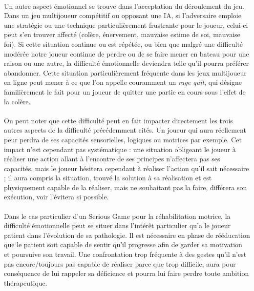 \paragraph{}
Un autre aspect émotionnel se trouve dans l’acceptation du déroulement du jeu. Dans un jeu multijoueur compétitif ou opposant une IA, si l’adversaire emploie une stratégie ou une technique particulièrement frustrante pour le joueur, celui-ci peut s’en trouver affecté (colère, énervement, mauvaise estime de soi, mauvaise foi). Si cette situation continue ou est répétée, ou bien que malgré une difficulté modérée notre joueur continue de perdre ou de se faire mener en bateau pour une raison ou une autre, la difficulté émotionnelle deviendra telle qu’il pourra préférer abandonner. Cette situation particulièrement fréquente dans les jeux multijoueur en ligne peut mener à ce que l’on appelle couramment un \emph{rage quit}, qui désigne familièrement le fait pour un joueur de quitter une partie en cours sous l'effet de la colère.

\paragraph{}On peut noter que cette difficulté peut en fait impacter directement les trois autres aspects de la difficulté précédemment cités. Un joueur qui aura réellement peur perdra de ses capacités sensorielles, logiques ou motrices par exemple. Cet impact n’est cependant pas systématique : une situation obligeant le joueur à réaliser une action allant à l’encontre de ses principes n’affectera pas ses capacités, mais le joueur hésitera cependant à réaliser l’action qu’il sait nécessaire ; il aura compris la situation, trouvé la solution à sa réalisation et est physiquement capable de la réaliser, mais ne souhaitant pas la faire, différera son exécution, voir l’évitera si possible.

\paragraph{}Dans le cas particulier d’un Serious Game pour la réhabilitation motrice, la difficulté émotionnelle peut se situer dans l’intérêt particulier qu’a le joueur patient dans l’évolution de sa pathologie. Il est nécessaire en phase de rééducation que le patient soit capable de sentir qu’il progresse afin de garder sa motivation et poursuive son travail. Une confrontation trop fréquente à des gestes qu’il n’est pas encore/toujours pas capable de réaliser parce que trop difficile, aura pour conséquence de lui rappeler sa déficience et pourra lui faire perdre toute ambition thérapeutique.
		
